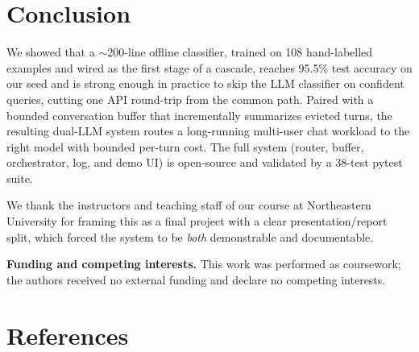 \documentclass{article}
\begin{document}
\section{Conclusion}
\label{sec:conclusion}

We showed that a $\sim$200-line offline classifier, trained on 108
hand-labelled examples and wired as the first stage of a cascade, reaches
95.5\% test accuracy on our seed and is strong enough in practice to skip
the LLM classifier on confident queries, cutting one API round-trip from
the common path. Paired with a bounded conversation buffer that
incrementally summarizes evicted turns, the resulting dual-LLM system
routes a long-running multi-user chat workload to the right model with
bounded per-turn cost. The full system (router, buffer, orchestrator, log,
and demo UI) is open-source and validated by a 38-test pytest suite.

\begin{ack}
We thank the instructors and teaching staff of our course at Northeastern
University for framing this as a final project with a clear
presentation/report split, which forced the system to be \emph{both}
demonstrable and documentable.

\textbf{Funding and competing interests.} This work was performed as
coursework; the authors received no external funding and declare no
competing interests.
\end{ack}

\section*{References}
\small
\end{document}
